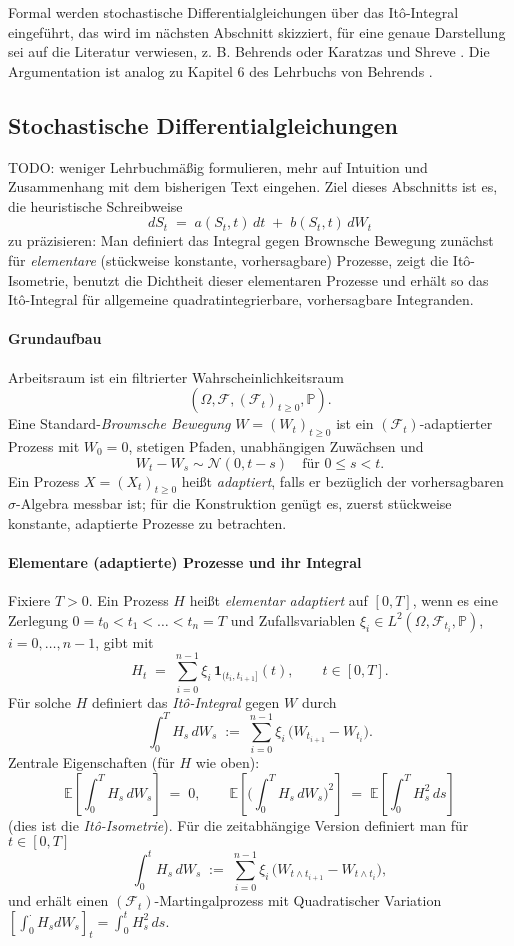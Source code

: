 Formal werden stochastische Differentialgleichungen über das It\^o-Integral eingeführt, das wird 
im nächsten Abschnitt skizziert, für eine genaue Darstellung sei auf die Literatur verwiesen, z. B. Behrends \cite{behrends} oder Karatzas und Shreve \cite{karatzas_brownian_1991}.
Die Argumentation ist analog zu Kapitel 6 des Lehrbuchs von Behrends \cite{behrends}.

\subsection{Stochastische Differentialgleichungen}
TODO: weniger Lehrbuchmäßig formulieren, mehr auf Intuition und Zusammenhang mit dem bisherigen Text eingehen.
Ziel dieses Abschnitts ist es, die heuristische Schreibweise
$$
dS_t \;=\; a(S_t,t)\,dt \;+\; b(S_t,t)\,dW_t
$$
zu präzisieren: Man definiert das Integral gegen Brownsche Bewegung zunächst für \emph{elementare} (stückweise konstante, vorhersagbare) Prozesse, zeigt die It\^o-Isometrie, benutzt die Dichtheit dieser elementaren Prozesse und erhält so das It\^o-Integral für allgemeine quadratintegrierbare, vorhersagbare Integranden.

\paragraph{Grundaufbau}
Arbeitsraum ist ein filtrierter Wahrscheinlichkeitsraum
$$
(\Omega,\mathcal F,(\mathcal F_t)_{t\ge 0},\mathbb P).
$$
Eine Standard-\emph{Brownsche Bewegung} $W=(W_t)_{t\ge 0}$ ist ein $(\mathcal F_t)$-adaptierter Prozess mit $W_0=0$, stetigen Pfaden, unabhängigen Zuwächsen und
$$
W_t - W_s \sim \mathcal N(0,t-s)\quad\text{für }0\le s<t.
$$
Ein Prozess $X=(X_t)_{t\ge 0}$ heißt \emph{adaptiert}, falls er bezüglich der vorhersagbaren $\sigma$-Algebra messbar ist; für die Konstruktion genügt es, zuerst stückweise konstante, adaptierte Prozesse zu betrachten.

\paragraph{Elementare (adaptierte) Prozesse und ihr Integral}
Fixiere $T>0$. Ein Prozess $H$ heißt \emph{elementar adaptiert} auf $[0,T]$, wenn es eine Zerlegung $0=t_0<t_1<\dots<t_n=T$ und Zufallsvariablen $\xi_i\in L^2(\Omega,\mathcal F_{t_i},\mathbb P)$, $i=0,\dots,n-1$, gibt mit
$$
H_t \;=\; \sum_{i=0}^{n-1} \xi_i\,\mathbf 1_{(t_i,t_{i+1}]}(t),\qquad t\in[0,T].
$$
Für solche $H$ definiert das \emph{It\^o-Integral} gegen $W$ durch
$$
\int_0^T H_s\,dW_s \;:=\; \sum_{i=0}^{n-1} \xi_i\,\big(W_{t_{i+1}}-W_{t_i}\big).
$$
Zentrale Eigenschaften (für $H$ wie oben):
$$
\mathbb E\!\left[\int_0^T H_s\,dW_s\right] \;=\; 0,\qquad
\mathbb E\!\left[\Big(\int_0^T H_s\,dW_s\Big)^{\!2}\right] \;=\; \mathbb E\!\left[\int_0^T H_s^2\,ds\right]
$$
(dies ist die \emph{It\^o-Isometrie}). Für die zeitabhängige Version definiert man für $t\in[0,T]$
$$
\int_0^t H_s\,dW_s \;:=\; \sum_{i=0}^{n-1} \xi_i\,\big(W_{t\wedge t_{i+1}}-W_{t\wedge t_i}\big),
$$
und erhält einen $(\mathcal F_t)$-Martingalprozess mit Quadratischer Variation
$[\!\int_0^\cdot H_s dW_s]_t = \int_0^t H_s^2\,ds$.

